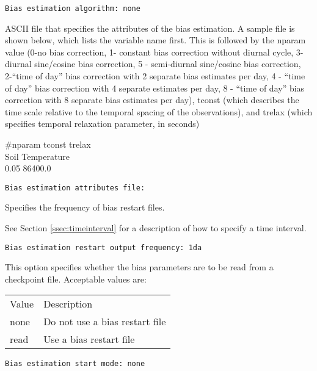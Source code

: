  \begin{Verbatim}[frame=single]
Bias estimation algorithm: none
 \end{Verbatim}

 
  ASCII file that
 specifies the attributes of the bias estimation. A
 sample file is shown below, which lists the variable
 name first. This is followed by the nparam value 
 (0-no bias correction, 1- constant bias correction without
 diurnal cycle, 3- diurnal sine/cosine bias correction, 
 5 - semi-diurnal sine/cosine bias correction, 
 2-``time of day'' bias correction with 2 separate bias
 estimates per day, 4 - ``time of day'' bias correction with 
 4 separate estimates per day, 8 - ``time of day'' bias 
 correction with 8 separate bias estimates per day), 
 tconst (which describes the time scale relative to the 
 temporal spacing of the observations), and trelax
 (which specifies temporal relaxation parameter, in seconds)

 \#nparam  tconst trelax \\
 \indent Soil Temperature        \\
     0.05    86400.0
 

 \begin{Verbatim}[frame=single]
Bias estimation attributes file:
 \end{Verbatim}

 
  Specifies the frequency
 of bias restart files.

 See Section \ref{ssec:timeinterval} for a description
 of how to specify a time interval.
 

 \begin{Verbatim}[frame=single]
Bias estimation restart output frequency: 1da
 \end{Verbatim}

 
  This option specifies whether the
 bias parameters are to be read from a checkpoint file. 
 Acceptable values are:

 \begin{tabular}{ll}
 Value & Description                    \\
 none  & Do not use a bias restart file \\
 read  & Use a bias restart file        \\
 \end{tabular}
 

 \begin{Verbatim}[frame=single]
Bias estimation start mode: none
 \end{Verbatim}

